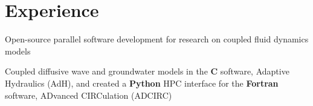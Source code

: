 \documentclass[letterpaper,10pt]{article}
\begin{document}
\strut{} %

\vspace{238.25pt}


%
%
%
%


\vspace{-2pt}
\section{Experience}
  \resumeSubHeadingListStart

 
        \resumeItemListStart
            {Open-source parallel software development for research on coupled
            fluid dynamics models}

            {Coupled diffusive wave and groundwater models in the \textbf{C}
            software, Adaptive Hydraulics (AdH), and created a \textbf{Python}
            HPC interface for the \textbf{Fortran} software, ADvanced
            CIRCulation (ADCIRC)}
        \resumeItemListEnd
\end{document}
